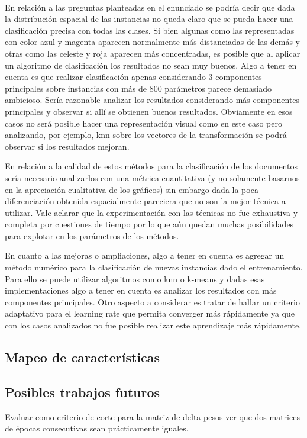\documentclass[informe.tex]{subfiles}
\begin{document}
      ~
      
      En relación a las preguntas planteadas en el enunciado se podría decir que dada la distribución espacial de las instancias no queda claro que se pueda hacer una clasificación precisa con todas las clases. Si bien algunas como las representadas con color azul y magenta aparecen normalmente más distanciadas de las demás y otras como las celeste y roja aparecen más concentradas, es posible que al aplicar un algoritmo de clasificación los resultados no sean muy buenos. Algo a tener en cuenta es que realizar clasificación apenas considerando 3 componentes principales sobre instancias con más de 800 parámetros parece demasiado ambicioso. Sería razonable analizar los resultados considerando más componentes principales y observar si all\'i se obtienen buenos resultados. Obviamente en esos casos no ser\'a posible hacer una representaci\'on visual como en este caso pero analizando, por ejemplo, knn sobre los vectores de la transformación se podr\'a observar si los resultados mejoran.
      
      En relación a la calidad de estos métodos para la clasificación de los documentos sería necesario analizarlos con una métrica cuantitativa (y no solamente basarnos en la apreciación cualitativa de los gráficos) sin embargo dada la poca diferenciación obtenida espacialmente pareciera que no son la mejor técnica a utilizar. Vale aclarar que la experimentación con las técnicas no fue exhaustiva y completa por cuestiones de tiempo por lo que aún quedan muchas posibilidades para explotar en los parámetros de los métodos.
      
      En cuanto a las mejoras o ampliaciones, algo a tener en cuenta es agregar un m\'etodo num\'erico para la clasificaci\'on de nuevas instancias dado el entrenamiento. Para ello se puede utilizar algoritmos como knn o k-means y dadas esas implementaciones algo a tener en cuenta es analizar los resultados con más componentes principales. Otro aspecto a considerar es tratar de hallar un criterio adaptativo para el learning rate que permita converger más rápidamente ya que con los casos analizados no fue posible realizar este aprendizaje más rápidamente.
      
      
      
    \subsection{Mapeo de características}
  
    \subsection{Posibles trabajos futuros}
    
      Evaluar como criterio de corte para la matriz de delta pesos ver que dos matrices de épocas consecutivas sean prácticamente iguales.
\end{document}
